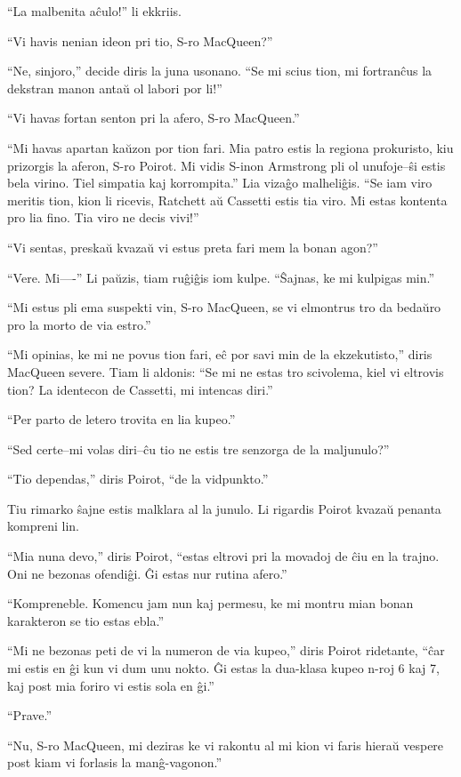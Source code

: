 ``La malbenita aĉulo!'' li ekkriis.

``Vi havis nenian ideon pri tio, S-ro MacQueen?''

``Ne, sinjoro,'' decide diris la juna usonano. ``Se mi scius tion, mi fortranĉus la dekstran manon antaŭ ol labori por li!''

``Vi havas fortan senton pri la afero, S-ro MacQueen.''

``Mi havas apartan kaŭzon por tion fari. Mia patro estis la regiona prokuristo, kiu prizorgis la aferon, S-ro Poirot. Mi vidis S-inon Armstrong pli ol unufoje--ŝi estis bela virino. Tiel simpatia kaj korrompita.'' Lia vizaĝo malheliĝis. ``Se iam viro meritis tion, kion li ricevis, Ratchett aŭ Cassetti estis tia viro. Mi estas kontenta pro lia fino. Tia viro ne decis vivi!''

``Vi sentas, preskaŭ kvazaŭ vi estus preta fari mem la bonan agon?''

``Vere. Mi----'' Li paŭzis, tiam ruĝiĝis iom kulpe. ``Ŝajnas, ke mi kulpigas min.''

``Mi estus pli ema suspekti vin, S-ro MacQueen, se vi elmontrus tro da bedaŭro pro la morto de via estro.''

``Mi opinias, ke mi ne povus tion fari, eĉ por savi min de la ekzekutisto,'' diris MacQueen severe. Tiam li aldonis: ``Se mi ne estas tro scivolema, kiel vi eltrovis tion? La identecon de Cassetti, mi intencas diri.''

``Per parto de letero trovita en lia kupeo.''

``Sed certe--mi volas diri--ĉu tio ne estis tre senzorga de la maljunulo?''

``Tio dependas,'' diris Poirot, ``de la vidpunkto.''

Tiu rimarko ŝajne estis malklara al la junulo. Li rigardis Poirot kvazaŭ penanta kompreni lin.

``Mia nuna devo,'' diris Poirot, ``estas eltrovi pri la movadoj de ĉiu en la trajno. Oni ne bezonas ofendiĝi. Ĝi estas nur rutina afero.''

``Kompreneble. Komencu jam nun kaj permesu, ke mi montru mian bonan karakteron se tio estas ebla.''

``Mi ne bezonas peti de vi la numeron de via kupeo,'' diris Poirot ridetante, ``ĉar mi estis en ĝi kun vi dum unu nokto. Ĝi estas la dua-klasa kupeo n-roj 6 kaj 7, kaj post mia foriro vi estis sola en ĝi.''

``Prave.''

``Nu, S-ro MacQueen, mi deziras ke vi rakontu al mi kion vi faris hieraŭ vespere post kiam vi forlasis la manĝ-vagonon.''

